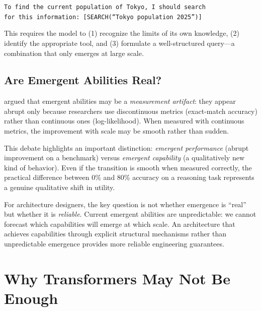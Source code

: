 \begin{center}
\begin{minipage}{0.85\textwidth}
\texttt{To find the current population of Tokyo, I should search}\\
\texttt{for this information: [SEARCH(``Tokyo population 2025'')]}
\end{minipage}
\end{center}

This requires the model to (1) recognize the limits of its own knowledge, (2) identify the appropriate tool, and (3) formulate a well-structured query---a combination that only emerges at large scale.

\subsection{Are Emergent Abilities Real?}

\citet{schaeffer2023emergent} argued that emergent abilities may be a \emph{measurement artifact}: they appear abrupt only because researchers use discontinuous metrics (exact-match accuracy) rather than continuous ones (log-likelihood). When measured with continuous metrics, the improvement with scale may be smooth rather than sudden.

This debate highlights an important distinction: \emph{emergent performance} (abrupt improvement on a benchmark) versus \emph{emergent capability} (a qualitatively new kind of behavior). Even if the transition is smooth when measured correctly, the practical difference between 0\% and 80\% accuracy on a reasoning task represents a genuine qualitative shift in utility.

\begin{implnote}
For architecture designers, the key question is not whether emergence is ``real'' but whether it is \emph{reliable}. Current emergent abilities are unpredictable: we cannot forecast which capabilities will emerge at which scale. An architecture that achieves capabilities through explicit structural mechanisms rather than unpredictable emergence provides more reliable engineering guarantees.
\end{implnote}

\section{Why Transformers May Not Be Enough}
\label{sec:transformer-limits}

